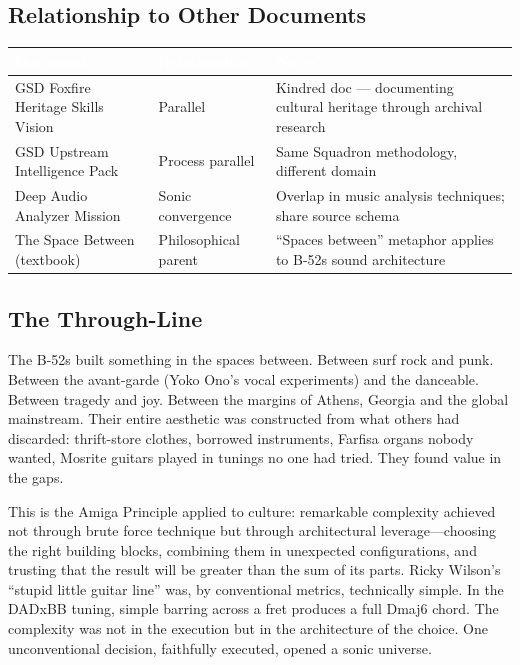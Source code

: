 \documentclass[11pt,letterpaper]{article}
\newcommand{\tableheader}[1]{\textbf{\sffamily\textcolor{white}{#1}}}
\begin{document}
\subsection{Relationship to Other Documents}

\begin{center}
\begin{tabularx}{\textwidth}{L{4.5cm}L{3.5cm}X}
\toprule
{}
\tableheader{Document} & \tableheader{Relationship} & \tableheader{Notes} \\
\midrule
GSD Foxfire Heritage Skills Vision & Parallel & Kindred doc --- documenting cultural heritage through archival research \\
GSD Upstream Intelligence Pack & Process parallel & Same Squadron methodology, different domain \\
Deep Audio Analyzer Mission & Sonic convergence & Overlap in music analysis techniques; share source schema \\
The Space Between (textbook) & Philosophical parent & ``Spaces between'' metaphor applies to B-52s sound architecture \\
\bottomrule
\end{tabularx}
\end{center}

\subsection{The Through-Line}

The B-52s built something in the spaces between. Between surf rock and punk. Between the avant-garde (Yoko Ono's vocal experiments) and the danceable. Between tragedy and joy. Between the margins of Athens, Georgia and the global mainstream. Their entire aesthetic was constructed from what others had discarded: thrift-store clothes, borrowed instruments, Farfisa organs nobody wanted, Mosrite guitars played in tunings no one had tried. They found value in the gaps.

This is the Amiga Principle applied to culture: remarkable complexity achieved not through brute force technique but through architectural leverage---choosing the right building blocks, combining them in unexpected configurations, and trusting that the result will be greater than the sum of its parts. Ricky Wilson's ``stupid little guitar line'' was, by conventional metrics, technically simple. In the DADxBB tuning, simple barring across a fret produces a full Dmaj6 chord. The complexity was not in the execution but in the architecture of the choice. One unconventional decision, faithfully executed, opened a sonic universe.
\end{document}
